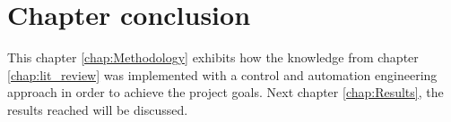 \section{Chapter conclusion}

This chapter \ref{chap:Methodology} exhibits how the knowledge from chapter \ref{chap:lit_review} was implemented with a control and automation engineering approach in order to achieve the project goals. 
Next chapter \ref{chap:Results}, the results reached will be discussed.

\clearpage